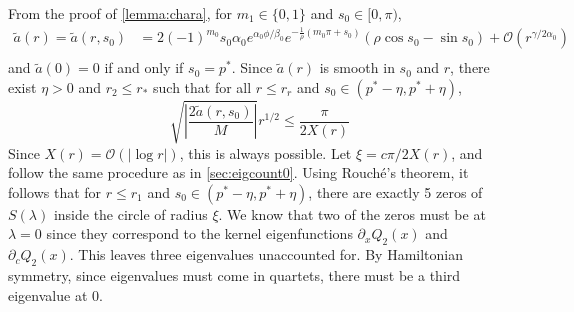 \documentclass[thesis.tex]{subfiles}
\begin{document}
From the proof of \cref{lemma:chara}, for $m_1 \in \{0, 1\}$ and $s_0 \in [0, \pi)$,
\begin{align*}
\tilde{a}(r) = \tilde{a}(r, s_0) &= 2 (-1)^{m_0} s_0 \alpha_0 e^{\alpha_0 \phi/\beta_0} e^{-\frac{1}{\rho}(m_0 \pi + s_0) } \left( \rho \cos s_0 - \sin s_0 \right) + \mathcal{O}\left(r^{\gamma/2\alpha_0} \right)\\
\end{align*}
and $\tilde{a}(0) = 0$ if and only if $s_0 = p^*$. Since $\tilde{a}(r)$ is smooth in $s_0$ and $r$, there exist $\eta > 0$ and $r_2 \leq r_*$ such that for all $r \leq r_r$ and $s_0 \in (p^* - \eta, p^* + \eta)$, 
\begin{equation}
\sqrt{ \left| \frac{ 2 \tilde{a}(r, s_0) }{M} \right| }  r^{1/2} \leq \frac{\pi}{2 X(r)}
\end{equation}
Since $X(r) = \mathcal{O}(|\log r|)$, this is always possible. Let $\xi = c \pi / 2 X(r)$, and follow the same procedure as in \cref{sec:eigcount0}. Using Rouch\'{e}'s theorem, it follows that for $r \leq r_1$ and $s_0 \in (p^* - \eta, p^* + \eta)$, there are exactly 5 zeros of $S(\lambda)$ inside the circle of radius $\xi$. We know that two of the zeros must be at $\lambda = 0$ since they correspond to the kernel eigenfunctions $\partial_x Q_2(x)$ and $\partial_c Q_2(x)$. This leaves three eigenvalues unaccounted for.
By Hamiltonian symmetry, since eigenvalues must come in quartets, there must be a third eigenvalue at 0.
\end{document}
